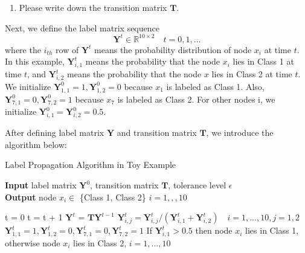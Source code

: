 \documentclass{article}
\begin{document}
 \begin{enumerate}
\item Please write down the transition matrix $\boldsymbol{T}$.
\end{enumerate}

Next, we define the label matrix sequence $$\boldsymbol{Y}^t \in \mathbb{R}^{10 \times 2} \quad t=0,1,...$$ where the $i_{th}$ row of $\boldsymbol{Y}^t$ means the probability distribution of node $x_i$ at time $t$. In this example, $\boldsymbol{Y}^t_{i,1}$ means the probability that the node $x_i$ lies in Class 1 at time $t$, and $\boldsymbol{Y}^t_{i,2}$ means the probability that the node $x$ lies in Class 2 at time $t$. We initialize $\boldsymbol{Y}^0_{1,1}=1, \boldsymbol{Y}^0_{1,2}=0$ because $x_1$ is labeled as Class 1. Also, $\boldsymbol{Y}^0_{7,1}=0, \boldsymbol{Y}^0_{7,2}=1$ because $x_7$ is labeled as Class 2. For other nodes i,  we initialize $\boldsymbol{Y}^0_{i,1}=\boldsymbol{Y}^0_{i, 2}=0.5$.

After defining label matrix $\boldsymbol{Y}$ and transition matrix $\boldsymbol{T}$, we introduce the algorithm below: \\

\begin{algorithm}
  \caption{Label Propagation Algorithm in Toy Example}
  \label{alg:label_propagation_algorithm_in_toy_example}
  \hspace*{\algorithmicindent} \textbf{Input}  label matrix $\boldsymbol{Y}^0$, transition matrix $\boldsymbol{T}$, tolerance level $\epsilon$ \\
  \hspace*{\algorithmicindent} \textbf{Output} node $x_i \in $ \{Class 1, Class 2\} \quad $i=1,,,10$
  \begin{algorithmic}[1]
    \State t = 0
    \Repeat
        \State t = t + 1
        \State $\boldsymbol{Y}^{t}$ = $\boldsymbol{T} \boldsymbol{Y}^{t-1}$ 
        \State $\boldsymbol{Y}^{t}_{i,j} = \boldsymbol{Y}^{t}_{i,j} / (\boldsymbol{Y}^{t}_{i,1} + \boldsymbol{Y}^{t}_{i,2}) \quad i=1,...,10, j=1,2$ 
        \State $\boldsymbol{Y}^{t}_{1,1} = 1, \boldsymbol{Y}^{t}_{1,2} = 0,\boldsymbol{Y}^{t}_{7,1} = 0,\boldsymbol{Y}^{t}_{7,2} = 1$ 
    \State If $\boldsymbol{Y}^{t}_{i,1} > 0.5$ then node $x_i$ lies in Class 1, otherwise node $x_i$ lies in Class 2, \quad $i=1,...,10$
    \EndProcedure
   \end{algorithmic}
\end{algorithm}
\end{document}
